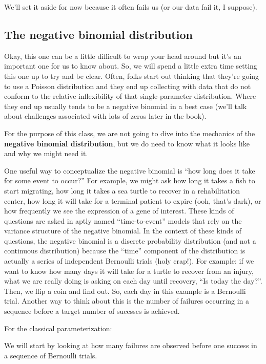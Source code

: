 \documentclass[
]{book}
\begin{document}
We'll set it aside for now because it often fails us (or our data fail it, I suppose).

\hypertarget{the-negative-binomial-distribution}{%
\subsection{The negative binomial distribution}\label{the-negative-binomial-distribution}}

Okay, this one can be a little difficult to wrap your head around but it's an important one for us to know about. So, we will spend a little extra time setting this one up to try and be clear. Often, folks start out thinking that they're going to use a Poisson distribution and they end up collecting with data that do not conform to the relative inflexibility of that single-parameter distribution. Where they end up usually tends to be a negative binomial in a best case (we'll talk about challenges associated with lots of zeros later in the book).

For the purpose of this class, we are not going to dive into the mechanics of the \textbf{negative binomial distribution}, but we do need to know what it looks like and why we might need it.

One useful way to conceptualize the negative binomial is ``how long does it take for some event to occur?'' For example, we might ask how long it takes a fish to start migrating, how long it takes a sea turtle to recover in a rehabilitation center, how long it will take for a terminal patient to expire (ooh, that's dark), or how frequently we see the expression of a gene of interest. These kinds of questions are asked in aptly named ``time-to-event'' models that rely on the variance structure of the negative binomial. In the context of these kinds of questions, the negative binomial is a discrete probability distribution (and not a continuous distribution) because the ``time'' component of the distribution is actually a series of independent Bernoulli trials (holy crap!). For example: if we want to know how many days it will take for a turtle to recover from an injury, what we are really doing is asking on each day until recovery, ``Is today the day?''. Then, we flip a coin and find out. So, each day in this example is a Bernoulli trial. Another way to think about this is the number of failures occurring in a sequence before a target number of sucesses is achieved.

For the classical parameterization:

We will start by looking at how many failures are observed before one success in a sequence of Bernoulli trials.
\end{document}
